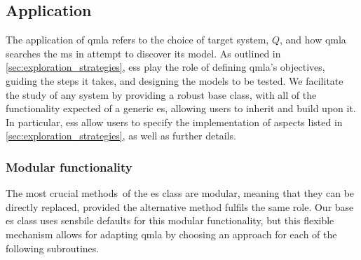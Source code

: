 \subsection{Application}\label{sec:application}
The application of \gls{qmla} refers to the choice of target system, $Q$, and how \gls{qmla} searches the 
    \gls{ms} in attempt to discover its model. 
As outlined in \cref{sec:exploration_strategies}, \glspl{es} play the role of 
    defining \gls{qmla}'s objectives, guiding the steps it takes, and designing the models to be tested. 
We facilitate the study of any system by providing a robust  base class,
    with all of the functionality expected of a generic \gls{es}, allowing users to inherit and build upon it. 
In particular, \glspl{es} allow users to specify the implementation of aspects listed in \cref{sec:exploration_strategies}, 
    as well as further details.
\par 


\subsubsection{Modular functionality}\label{sec:modular_functionality}
The most crucial methods\footnotemark \ of the \gls{es} class are modular, 
    meaning that they can be directly replaced, provided the alternative method fulfils the same role. 
Our base \gls{es} class uses sensbile defaults for this modular functionality, 
    but this flexible mechanism allows for adapting \gls{qmla} by choosing an approach for each 
    of the following subroutines. 

